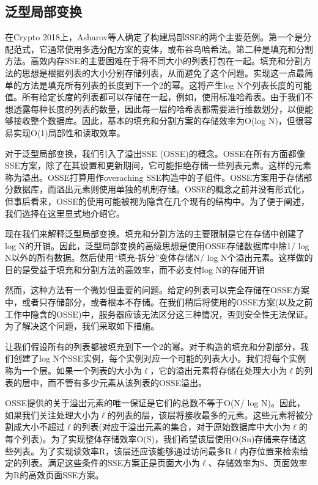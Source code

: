\documentclass[UTF8]{article}
\begin{document}
\subsection{泛型局部变换}
在Crypto 2018上，Asharov等人确定了构建局部SSE的两个主要范例\cite{GiladAsharov2021TightTI}。第一个是分配范式，它通常使用多选分配方案的变体，或布谷鸟哈希法。第二种是填充和分割方法。高效内存SSE的主要困难在于将不同大小的列表打包在一起。填充和分割方法的思想是根据列表的大小分别存储列表，从而避免了这个问题。实现这一点最简单的方法是填充所有列表的长度到下一个2的幂。这将产生log N个列表长度的可能值。所有给定长度的列表都可以存储在一起，例如，使用标准哈希表。由于我们不想透露每种长度的列表的数量，因此每一层的哈希表都需要进行维数划分，以便能够接收整个数据库。因此，基本的填充和分割方案的存储效率为O(log N)，但很容易实现O(1)局部性和读取效率。

对于泛型局部变换，我们引入了溢出SSE (OSSE)的概念。OSSE在所有方面都像SSE方案，除了在其设置和更新期间，它可能拒绝存储一些列表元素。这样的元素称为溢出。OSSE打算用作overaching SSE构造中的子组件。OSSE方案用于存储部分数据库，而溢出元素则使用单独的机制存储。OSSE的概念之前并没有形式化，但事后看来，OSSE的使用可能被视为隐含在几个现有的结构中。为了便于阐述，我们选择在这里显式地介绍它。

现在我们来解释泛型局部变换。填充和分割方法的主要限制是它在存储中创建了log N的开销。因此，泛型局部变换的高级思想是使用OSSE存储数据库中除1/ log N以外的所有数据。然后使用“填充-拆分”变体存储N/ log N个溢出元素。这样做的目的是受益于填充和分割方法的高效率，而不必支付log N的存储开销

然而，这种方法有一个微妙但重要的问题。给定的列表可以完全存储在OSSE方案中，或者只存储部分，或者根本不存储。在我们稍后将使用的OSSE方案(以及之前工作中隐含的OSSE)中，服务器应该无法区分这三种情况，否则安全性无法保证。为了解决这个问题，我们采取如下措施。

让我们假设所有的列表都被填充到下一个2的幂。对于构造的填充和分割部分，我们创建了log N个SSE实例，每个实例对应一个可能的列表大小。我们将每个实例称为一个层。如果一个列表的大小为$\ell$，它的溢出元素将存储在处理大小为$\ell$的列表的层中，而不管有多少元素从该列表的OSSE溢出。

OSSE提供的关于溢出元素的唯一保证是它们的总数不等于O(N/ log N)。因此，如果我们关注处理大小为$\ell$的列表的层，该层将接收最多的元素。这些元素将被分割成大小不超过$\ell$的列表(对应于溢出元素的集合，对于原始数据库中大小为$\ell$的每个列表)。为了实现整体存储效率O(S)，我们希望该层使用O(Sn)存储来存储这些列表。为了实现读效率R，该层还应该能够通过访问最多R$\ell$内存位置来检索给定的列表。满足这些条件的SSE方案正是页面大小为$\ell$、存储效率为S、页面效率为R的高效页面SSE方案。
\end{document}
